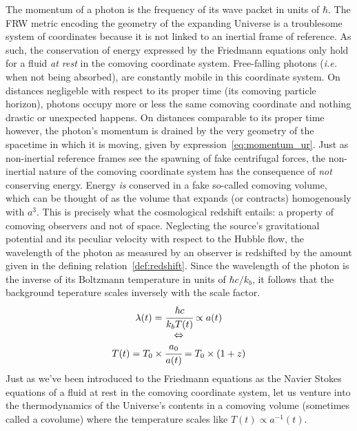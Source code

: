 \vspace*{1pc}

The momentum of a photon is the frequency of its wave packet in units of $\hbar$. The FRW metric encoding the geometry of the expanding Universe is a troublesome system of coordinates because it is not linked to an inertial frame of reference. As such, the conservation of energy expressed by the Friedmann equations only hold for a fluid \emph{at rest} in the comoving coordinate system. Free-falling photons (\textit{i.e.} when not being absorbed), are constantly mobile in this coordinate system. On distances negligeble with respect to its proper time (its comoving particle horizon), photons occupy more or less the same comoving coordinate and nothing drastic or unexpected happens. On distances comparable to its proper time however, the photon's momentum is drained by the very geometry of the spacetime in which it is moving, given by expression~\ref{eq:momentum_ur}. Just as non-inertial reference frames see the spawning of fake centrifugal forces, the non-inertial nature of the comoving coordinate system has the consequence of \emph{not} conserving energy. Energy \emph{is} conserved in a fake so-called comoving volume, which can be thought of as the volume that expands (or contracts) homogenously with $a^3$. This is precisely what the cosmological redshift entails: a property of comoving observers and not of space. Neglecting the source's gravitational potential and its peculiar velocity with respect to the Hubble flow, the wavelength of the photon as measured by an observer is redshifted by the amount given in the defining relation~\ref{def:redshift}. Since the wavelength of the photon is the inverse of its Boltzmann temperature in units of $\hbar c/k_b$, it follows that the background teperature scales inversely with the scale factor.
\begin{equation}
\begin{array}{c}
\lambda(t) = \cfrac{\hbar c}{k_b T(t)} \propto a(t)\\
\Leftrightarrow\\
T(t) = T_0 \times \cfrac{a_0}{a(t)} = T_0 \times (1+z)
\end{array}
\end{equation}
Just as we've been introduced to the Friedmann equations as the Navier Stokes equations of a fluid at rest in the comoving coordinate system, let us venture into the thermodynamics of the Universe's contents in a comoving volume (sometimes called a covolume) where the temperature scales like $T(t) \propto a^{-1} (t)$.\\


